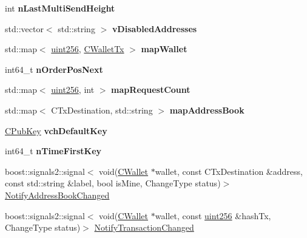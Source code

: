 \begin{DoxyCompactItemize}
\mbox{\label{class_c_wallet_a600b9d6c61622bf8d21f41c9968cbdc4}} 
int {\bfseries n\+Last\+Multi\+Send\+Height}
\item 
\mbox{\label{class_c_wallet_afe3c81e6c9b2f2ba6708b472a59ef068}} 
std\+::vector$<$ std\+::string $>$ {\bfseries v\+Disabled\+Addresses}
\item 
\mbox{\label{class_c_wallet_a0b17f72f2170090f2de43a6c48af3214}} 
std\+::map$<$ \mbox{\hyperlink{classuint256}{uint256}}, \mbox{\hyperlink{class_c_wallet_tx}{C\+Wallet\+Tx}} $>$ {\bfseries map\+Wallet}
\item 
\mbox{\label{class_c_wallet_af56cb17b19742506fc8d9449fc60884e}} 
int64\+\_\+t {\bfseries n\+Order\+Pos\+Next}
\item 
\mbox{\label{class_c_wallet_ade5f0fc0e722433b421c32f97bd873a8}} 
std\+::map$<$ \mbox{\hyperlink{classuint256}{uint256}}, int $>$ {\bfseries map\+Request\+Count}
\item 
\mbox{\label{class_c_wallet_afed31f2489c987e0f76233121ed84ab7}} 
std\+::map$<$ C\+Tx\+Destination, std\+::string $>$ {\bfseries map\+Address\+Book}
\item 
\mbox{\label{class_c_wallet_a6d415899e530a91e6e28dd0fa4ecef8d}} 
\mbox{\hyperlink{class_c_pub_key}{C\+Pub\+Key}} {\bfseries vch\+Default\+Key}
\item 
\mbox{\label{class_c_wallet_a817c0d1034377a7bd70a714140a5a8ca}} 
int64\+\_\+t {\bfseries n\+Time\+First\+Key}
\item 
boost\+::signals2\+::signal$<$ void(\mbox{\hyperlink{class_c_wallet}{C\+Wallet}} $\ast$wallet, const C\+Tx\+Destination \&address, const std\+::string \&label, bool is\+Mine, Change\+Type status)$>$ \mbox{\hyperlink{class_c_wallet_a86f4563888686dd3dbdee406f74f8d3f}{Notify\+Address\+Book\+Changed}}
\item 
boost\+::signals2\+::signal$<$ void(\mbox{\hyperlink{class_c_wallet}{C\+Wallet}} $\ast$wallet, const \mbox{\hyperlink{classuint256}{uint256}} \&hash\+Tx, Change\+Type status)$>$ \mbox{\hyperlink{class_c_wallet_acd26616ef558afbc5bc62d72603957fc}{Notify\+Transaction\+Changed}}
\end{DoxyCompactItemize}
